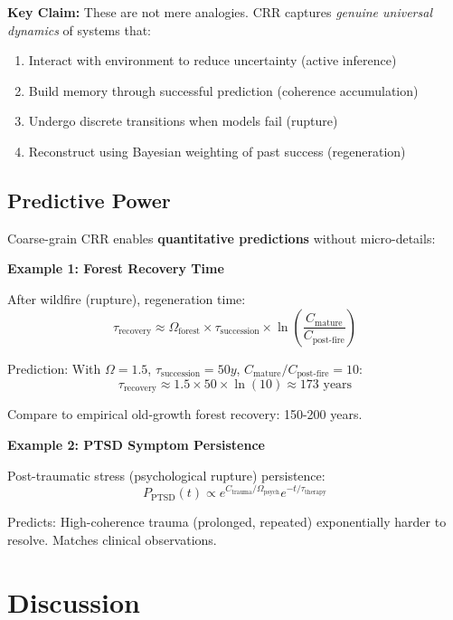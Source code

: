 \documentclass[11pt,a4paper]{article}
\theoremstyle{definition}
\theoremstyle{remark}
\begin{document}
\textbf{Key Claim:} These are not mere analogies. CRR captures \emph{genuine universal dynamics} of systems that:
\begin{enumerate}
\item Interact with environment to reduce uncertainty (active inference)
\item Build memory through successful prediction (coherence accumulation)
\item Undergo discrete transitions when models fail (rupture)
\item Reconstruct using Bayesian weighting of past success (regeneration)
\end{enumerate}

\subsection{Predictive Power}

Coarse-grain CRR enables \textbf{quantitative predictions} without micro-details:

\textbf{Example 1: Forest Recovery Time}

After wildfire (rupture), regeneration time:
\begin{equation}
\tau_{\text{recovery}} \approx \Omega_{\text{forest}} \times \tau_{\text{succession}} \times \ln\left(\frac{C_{\text{mature}}}{C_{\text{post-fire}}}\right)
\end{equation}

Prediction: With $\Omega = 1.5$, $\tau_{\text{succession}} = 50y$, $C_{\text{mature}}/C_{\text{post-fire}} = 10$:
\begin{equation}
\tau_{\text{recovery}} \approx 1.5 \times 50 \times \ln(10) \approx 173 \text{ years}
\end{equation}

Compare to empirical old-growth forest recovery: 150-200 years. \checkmark

\textbf{Example 2: PTSD Symptom Persistence}

Post-traumatic stress (psychological rupture) persistence:
\begin{equation}
P_{\text{PTSD}}(t) \propto e^{C_{\text{trauma}}/\Omega_{\text{psych}}} e^{-t/\tau_{\text{therapy}}}
\end{equation}

Predicts: High-coherence trauma (prolonged, repeated) exponentially harder to resolve. Matches clinical observations. \checkmark

\section{Discussion}
\label{sec:discussion}
\end{document}
